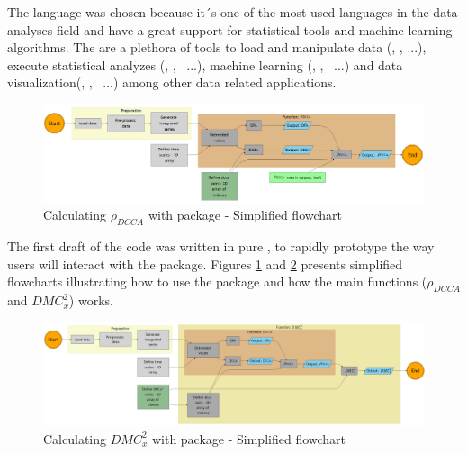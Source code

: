 \documentclass[article]{jss}
\begin{document}
The  language was chosen because it´s one of the most used languages in the data analyses field and have a great support for statistical tools and machine learning algorithms. The are a plethora of tools to load and manipulate data (, ,  ...), execute statistical analyzes (, , ~...), machine learning (, , ~...) and data visualization(, , ~...) among other data related applications.

\begin{figure}[h!]
  \centering
  \includegraphics{./figs/pdcca_chart.png}
  \caption{\label{fig:pdcca_chart}Calculating  $\rho_{DCCA}$ with  package - Simplified flowchart}
\end{figure}

The first draft of the code was written in pure , to rapidly prototype the way users will interact with the package. Figures \ref{fig:pdcca_chart} and \ref{fig:dmc_chart} presents simplified flowcharts illustrating how to use the package and how the main functions ($\rho_{DCCA}$ and $DMC_x^2$) works.

\begin{figure}[h!]
  \centering
  \includegraphics{./figs/dmc_chart.png}
  \caption{\label{fig:dmc_chart}Calculating  $DMC_x^2$ with  package - Simplified flowchart}
\end{figure}
\end{document}
